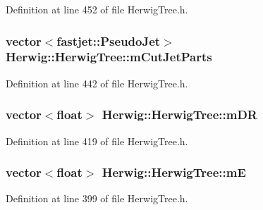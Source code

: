 Definition at line 452 of file Herwig\+Tree.\+h.

\subsubsection[{\texorpdfstring{m\+Cut\+Jet\+Parts}{mCutJetParts}}]{\setlength{\rightskip}{0pt plus 5cm}vector$<$fastjet\+::\+Pseudo\+Jet$>$ Herwig\+::\+Herwig\+Tree\+::m\+Cut\+Jet\+Parts\hspace{0.3cm}{\ttfamily [protected]}}\hypertarget{class_herwig_1_1_herwig_tree_a33c5453b6426268754d1f0c36bd62ef1}{}\label{class_herwig_1_1_herwig_tree_a33c5453b6426268754d1f0c36bd62ef1}


Definition at line 442 of file Herwig\+Tree.\+h.

\subsubsection[{\texorpdfstring{m\+DR}{mDR}}]{\setlength{\rightskip}{0pt plus 5cm}vector$<$float$>$ Herwig\+::\+Herwig\+Tree\+::m\+DR\hspace{0.3cm}{\ttfamily [protected]}}\hypertarget{class_herwig_1_1_herwig_tree_a68f88a82fd213cbe59b51c019f5773d1}{}\label{class_herwig_1_1_herwig_tree_a68f88a82fd213cbe59b51c019f5773d1}


Definition at line 419 of file Herwig\+Tree.\+h.

\subsubsection[{\texorpdfstring{mE}{mE}}]{\setlength{\rightskip}{0pt plus 5cm}vector$<$float$>$ Herwig\+::\+Herwig\+Tree\+::mE\hspace{0.3cm}{\ttfamily [protected]}}\hypertarget{class_herwig_1_1_herwig_tree_a14b6321a20f27ad9211ad7624113bb3b}{}\label{class_herwig_1_1_herwig_tree_a14b6321a20f27ad9211ad7624113bb3b}


Definition at line 399 of file Herwig\+Tree.\+h.

